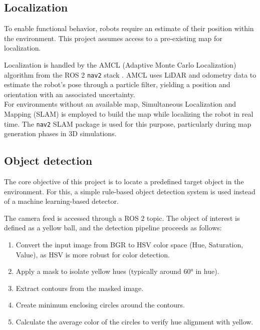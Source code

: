 
\subsection{Localization}
\label{sub:localization} 
To enable functional behavior, robots require an estimate of their position within the environment. This project assumes access to a pre-existing map for localization.

Localization is handled by the AMCL (Adaptive Monte Carlo Localization) algorithm \cite{amcl} from the ROS 2 \texttt{nav2} stack \cite{nav2}. AMCL uses LiDAR and odometry data to estimate the robot’s pose through a particle filter, yielding a position and orientation with an associated uncertainty.\\

For environments without an available map, Simultaneous Localization and Mapping (SLAM) is employed to build the map while localizing the robot in real time. The \texttt{nav2} SLAM package is used for this purpose, particularly during map generation phases in 3D simulations.

\subsection{Object detection}
\label{sub:object_detection}
The core objective of this project is to locate a predefined target object in the environment. For this, a simple rule-based object detection system is used instead of a machine learning-based detector.

The camera feed is accessed through a ROS 2 topic. The object of interest is defined as a yellow ball, and the detection pipeline proceeds as follows:
\begin{enumerate}
    \item Convert the input image from BGR to HSV color space (Hue, Saturation, Value), as HSV is more robust for color detection.
    \item Apply a mask to isolate yellow hues (typically around 60° in hue).
    \item Extract contours from the masked image.
    \item Create minimum enclosing circles around the contours.
    \item Calculate the average color of the circles to verify hue alignment with yellow.
\end{enumerate}

